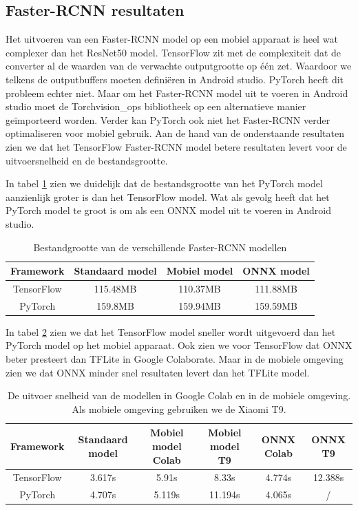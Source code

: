 \subsection{Faster-RCNN resultaten}
Het uitvoeren van een Faster-RCNN model op een mobiel apparaat is heel wat complexer dan het ResNet50 model.
TensorFlow zit met de complexiteit dat de converter al de waarden van de verwachte outputgrootte op \'e\'en zet.
Waardoor we telkens de outputbuffers moeten defini\"eren in Android studio.
PyTorch heeft dit probleem echter niet.
Maar om het Faster-RCNN model uit te voeren in Android studio moet de Torchvision\_ops bibliotheek op een alternatieve manier ge\"importeerd worden.
Verder kan PyTorch ook niet het Faster-RCNN verder optimaliseren voor mobiel gebruik.
Aan de hand van de onderstaande resultaten zien we dat het TensorFlow Faster-RCNN model betere resultaten levert voor de uitvoersnelheid en de bestandsgrootte.

In tabel \ref{tab:rcnn_size} zien we duidelijk dat de bestandsgrootte van het PyTorch model aanzienlijk groter is dan het TensorFlow model.
Wat als gevolg heeft dat het PyTorch model te groot is om als een ONNX model uit te voeren in Android studio.
\begin{table}[!ht]
    \caption{Bestandgrootte van de verschillende Faster-RCNN modellen}
\begin{tabular}{cccc}
    \hline
    Framework & Standaard model & Mobiel model & ONNX model \\
    \hline
    TensorFlow & 115.48MB & 110.37MB & 111.88MB \\
    PyTorch & 159.8MB & 159.94MB & 159.59MB \\
    \hline
\end{tabular}
\label{tab:rcnn_size}
\end{table}

In tabel \ref{tab:rcnn_speed} zien we dat het TensorFlow model sneller wordt uitgevoerd dan het PyTorch model op het mobiel apparaat.
Ook zien we voor TensorFlow dat ONNX beter presteert dan TFLite in Google Colaborate.
Maar in de mobiele omgeving zien we dat ONNX minder snel resultaten levert dan het TFLite model.
\begin{table}[!ht]
    \caption{De uitvoer snelheid van de modellen in Google Colab en in de mobiele omgeving. Als mobiele omgeving gebruiken we de Xiaomi T9.}
\begin{tabular}{cccccc}
    \hline
    Framework & Standaard model & Mobiel model Colab & Mobiel model T9 & ONNX Colab & ONNX T9\\
    \hline
    TensorFlow & 3.617s & 5.91s & 8.33s & 4.774s & 12.388s \\
    PyTorch & 4.707s & 5.119s & 11.194s & 4.065s & / \\
    \hline
\end{tabular}
\label{tab:rcnn_speed}
\end{table}

